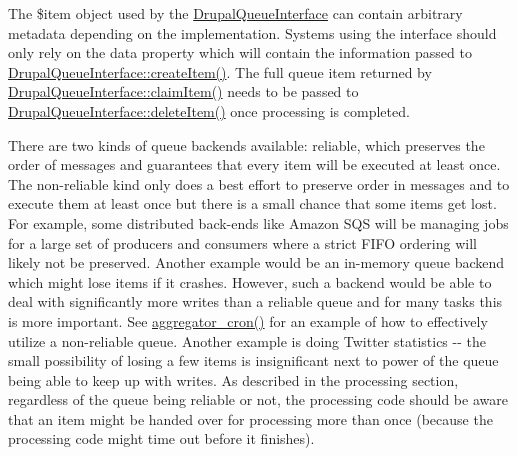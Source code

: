 The \$item object used by the \hyperlink{interfaceDrupalQueueInterface}{DrupalQueueInterface} can contain arbitrary metadata depending on the implementation. Systems using the interface should only rely on the data property which will contain the information passed to \hyperlink{interfaceDrupalQueueInterface_a1bdef6341808aaf8b3de821b7b71f137}{DrupalQueueInterface::createItem()}. The full queue item returned by \hyperlink{interfaceDrupalQueueInterface_a2f0f2ccc1f4d55c0890897ea85e75954}{DrupalQueueInterface::claimItem()} needs to be passed to \hyperlink{interfaceDrupalQueueInterface_aa61212089c1bcc410e8f87f8e619e351}{DrupalQueueInterface::deleteItem()} once processing is completed.

There are two kinds of queue backends available: reliable, which preserves the order of messages and guarantees that every item will be executed at least once. The non-\/reliable kind only does a best effort to preserve order in messages and to execute them at least once but there is a small chance that some items get lost. For example, some distributed back-\/ends like Amazon SQS will be managing jobs for a large set of producers and consumers where a strict FIFO ordering will likely not be preserved. Another example would be an in-\/memory queue backend which might lose items if it crashes. However, such a backend would be able to deal with significantly more writes than a reliable queue and for many tasks this is more important. See \hyperlink{aggregator_8module_adbe7d09140773c5485cda52dd03bdab5}{aggregator\_\-cron()} for an example of how to effectively utilize a non-\/reliable queue. Another example is doing Twitter statistics -\/-\/ the small possibility of losing a few items is insignificant next to power of the queue being able to keep up with writes. As described in the processing section, regardless of the queue being reliable or not, the processing code should be aware that an item might be handed over for processing more than once (because the processing code might time out before it finishes). 
